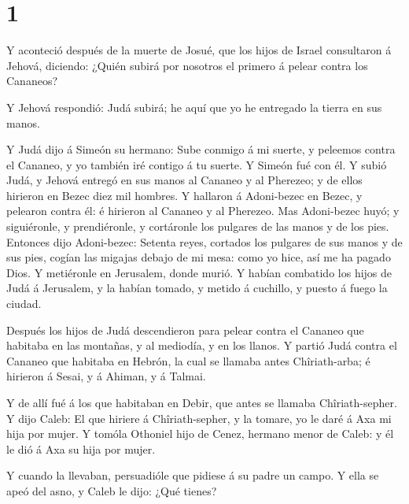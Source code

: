\hypertarget{section}{%
\section{1}\label{section}}

 Y aconteció después de la muerte de Josué, que los hijos de
Israel consultaron á Jehová, diciendo: ¿Quién subirá por nosotros el
primero á pelear contra los Cananeos?

 Y Jehová respondió: Judá subirá; he aquí que yo he
entregado la tierra en sus manos.

 Y Judá dijo á Simeón su hermano: Sube conmigo á mi suerte,
y peleemos contra el Cananeo, y yo también iré contigo á tu suerte. Y
Simeón fué con él.  Y subió Judá, y Jehová entregó en sus
manos al Cananeo y al Pherezeo; y de ellos hirieron en Bezec diez mil
hombres.  Y hallaron á Adoni-bezec en Bezec, y pelearon
contra él: é hirieron al Cananeo y al Pherezeo.  Mas
Adoni-bezec huyó; y siguiéronle, y prendiéronle, y cortáronle los
pulgares de las manos y de los pies.  Entonces dijo
Adoni-bezec: Setenta reyes, cortados los pulgares de sus manos y de sus
pies, cogían las migajas debajo de mi mesa: como yo hice, así me ha
pagado Dios. Y metiéronle en Jerusalem, donde murió.  Y
habían combatido los hijos de Judá á Jerusalem, y la habían tomado, y
metido á cuchillo, y puesto á fuego la ciudad.

 Después los hijos de Judá descendieron para pelear contra
el Cananeo que habitaba en las montañas, y al mediodía, y en los llanos.
 Y partió Judá contra el Cananeo que habitaba en Hebrón, la
cual se llamaba antes Chîriath-arba; é hirieron á Sesai, y á Ahiman, y á
Talmai.

 Y de allí fué á los que habitaban en Debir, que antes se
llamaba Chîriath-sepher.  Y dijo Caleb: El que hiriere á
Chîriath-sepher, y la tomare, yo le daré á Axa mi hija por mujer.
 Y tomóla Othoniel hijo de Cenez, hermano menor de Caleb: y
él le dió á Axa su hija por mujer.

 Y cuando la llevaban, persuadióle que pidiese á su padre
un campo. Y ella se apeó del asno, y Caleb le dijo: ¿Qué tienes?

